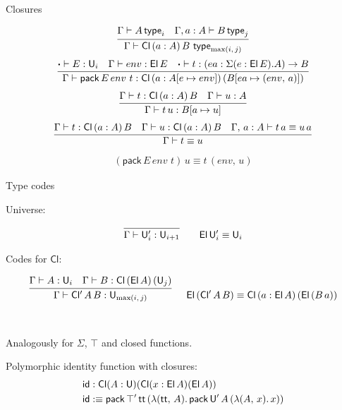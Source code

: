 \documentclass{beamer}
\newcommand{\type}{\mathsf{type}}
\newcommand{\Cl}{\mathsf{Cl}}
\newcommand{\pack}{\mathsf{pack}}
\begin{document}
\begin{frame}{Closures}

\begin{gather*}
  \infer{\Gamma \vdash \Cl\,(a : A)\,B\,\,\type_{\max(i,\,j)}}{\Gamma \vdash A\,\type_i & \Gamma, a : A \vdash B\,\type_j}
\end{gather*}
\begin{gather*}
\infer{\Gamma \vdash \pack\,E\,env\,\,t : \Cl\,(a : A[e\mapsto env])\,(B[ea \mapsto (env,\,a)])}{\boldsymbol{\cdot} \vdash E : \U_i & \Gamma \vdash env : \El\, E & \boldsymbol{\cdot} \vdash t : (ea : \Sigma(e : \El\,E).A) \ra B}
\end{gather*}
\begin{gather*}
  \infer{\Gamma \vdash t\,u : B[a \mapsto u]}{\Gamma \vdash t : \Cl\,(a : A)\,B & \Gamma \vdash u : A}
\end{gather*}
\begin{gather*}
  \infer{\Gamma \vdash t \equiv u}{\Gamma \vdash t : \Cl\,(a : A)\,B & \Gamma \vdash u : \Cl\,(a : A)\,B & \Gamma,\,a : A \vdash t\,a \equiv u\,a}
\end{gather*}
\begin{gather*}
  (\pack\,E\,env\,\,t)\,u \equiv t\,(env,\,u)
\end{gather*}
\end{frame}

\begin{frame}{Type codes}

Universe:

\begin{gather*}
\infer{\Gamma \vdash \U'_i : \U_{i+1}}{}\hspace{2em} \El\,\U'_i\equiv \U_i
\end{gather*}

Codes for $\Cl$:

\begin{gather*}
  \infer{\Gamma \vdash \mathsf{Cl'}\,A\,B : \U_{\max(i,\,j)}}
        {\Gamma \vdash A : \U_i & \Gamma \vdash B : \Cl\,(\El\,A)\,(\U_j)}
  \hspace{1.5em}
  \El\,(\mathsf{Cl'}\,A\,B)\equiv \Cl\,(a : \El\,A)\,(\El\,(B\,a))
\end{gather*}
\\~\\
Analogously for $\Sigma$, $\top$ and closed functions.

\end{frame}

\begin{frame}
Polymorphic identity function with closures:
\begin{alignat*}{5}
    & \mathsf{id} : \Cl(A : \U)(\Cl(x : \El\,A)(\El\,A)) \\
    & \mathsf{id} :\equiv \pack\,\top'\,\tt\,(\lambda(\tt,\,A).\, \pack\,\U'\,A\,(\lambda(A,\,x).\,x))
\end{alignat*}
\end{frame}
\end{document}
